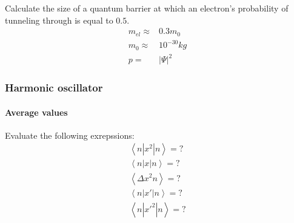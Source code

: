 				Calculate the size of a quantum barrier at which an electron's probability of tunneling through is equal to $0.5$.
				\begin{align}
					m_{el} \approx& 0.3 m_0 \\
					m_0 \approx& 10^{-30}\si{kg} \\
					p =& |\Psi|^2
				\end{align}
		\subsubsection{Harmonic oscillator}
			\paragraph{Average values}
				Evaluate the following exrepssions:
				\begin{align}
					\left\langle n|x^2| n\right\rangle = ?\\
					\left\langle n|x| n\right\rangle = ?\\
					\left\langle \Delta x^2 n\right\rangle = ?\\
					\left\langle n|x'| n\right\rangle = ?\\
					\left\langle n|x'^2| n\right\rangle = ? \\																				
				\end{align}				
			